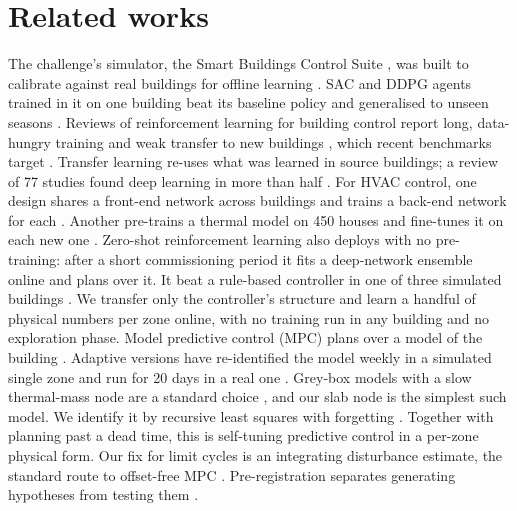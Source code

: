 \documentclass{article}
\begin{document}
\section{Related works}
The challenge's simulator, the Smart Buildings Control Suite \cite{goldfeder2024smart}, was built to calibrate against
real buildings for offline learning \cite{goldfeder2023lightweight}. SAC and DDPG agents trained in it on one building
beat its baseline policy and generalised to unseen seasons \cite{goldfeder2025rl}. Reviews of reinforcement learning
for building control report long, data-hungry training and weak transfer to new buildings \cite{wang2020rl}, which
recent benchmarks target \cite{taboga2026b2b}.
Transfer learning re-uses what was learned in source buildings; a review of 77 studies found deep learning in more
than half \cite{pinto2022transfer}. For HVAC control, one design shares a front-end network across buildings and
trains a back-end network for each \cite{xu2020onefor}. Another pre-trains a thermal model on 450 houses and fine-tunes
it on each new one \cite{raisch2025gentl}.
Zero-shot reinforcement learning also deploys with no pre-training: after a short commissioning period it fits a
deep-network ensemble online and plans over it. It beat a rule-based controller in one of three simulated
buildings \cite{jeen2023zeroshot}. We transfer only the controller's structure and learn a handful of physical numbers
per zone online, with no training run in any building and no exploration phase. Model
predictive control (MPC) plans over a model of the building \cite{oldewurtel2012mpc,drgona2020mpc}.
Adaptive versions have re-identified the model weekly in a simulated single zone \cite{zeng2021adaptive} and run for 20
days in a real one \cite{lian2023adaptive}. Grey-box models
with a slow thermal-mass node are a standard choice \cite{bacher2011greybox}, and our slab node is the simplest such
model. We identify it by recursive least squares with forgetting \cite{ljung1999system}. Together with planning past a
dead time, this is self-tuning predictive control \cite{clarke1987gpc} in a per-zone physical form. Our fix for limit
cycles is an integrating disturbance estimate, the standard route to offset-free MPC
\cite{muske2002disturbance,pannocchia2003disturbance}. Pre-registration separates generating hypotheses from testing
them \cite{nosek2018preregistration}.
\end{document}
